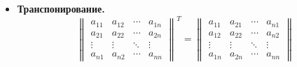 \begin{itemize}
	\item\textbf{Транспонирование.}
	\begin{equation*}
	\begin{Vmatrix}
	a_{11} & a_{12} & \cdots & a_{1n} \\
	a_{21} & a_{22} & \cdots & a_{2n} \\
	\vdots & \vdots & \ddots & \vdots \\
	a_{n1} & a_{n2} & \cdots & a_{nn}
	\end{Vmatrix}^T =
	\begin{Vmatrix}
	a_{11} & a_{21} & \cdots & a_{n1} \\
	a_{12} & a_{22} & \cdots & a_{n2} \\
	\vdots & \vdots & \ddots & \vdots \\
	a_{1n} & a_{2n} & \cdots & a_{nn}
	\end{Vmatrix}
	\end{equation*}
\end{itemize}